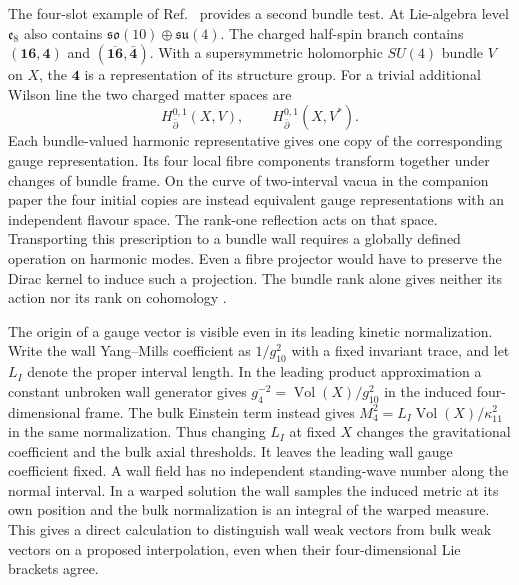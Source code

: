\documentclass[aps,prd,reprint,onecolumn,nofootinbib,amsmath,amssymb]{revtex4-2}
\begin{document}
The four-slot example of Ref.~\cite{gennote} provides a second bundle test. At Lie-algebra level $\mathfrak e_8$ also contains $\mathfrak{so}(10)\oplus\mathfrak{su}(4)$. The charged half-spin branch contains $(\mathbf{16},\mathbf4)$ and $(\overline{\mathbf{16}},\bar{\mathbf4})$. With a supersymmetric holomorphic $SU(4)$ bundle $V$ on $X$, the $\mathbf4$ is a representation of its structure group. For a trivial additional Wilson line the two charged matter spaces are
\begin{equation}
 H^{0,1}_{\bar\partial}(X,V),\qquad
 H^{0,1}_{\bar\partial}(X,V^*) .
\end{equation}
Each bundle-valued harmonic representative gives one copy of the corresponding gauge representation. Its four local fibre components transform together under changes of bundle frame. On the curve of two-interval vacua in the companion paper the four initial copies are instead equivalent gauge representations with an independent flavour space. The rank-one reflection acts on that space. Transporting this prescription to a bundle wall requires a globally defined operation on harmonic modes. Even a fibre projector would have to preserve the Dirac kernel to induce such a projection. The bundle rank alone gives neither its action nor its rank on cohomology \cite{Braun2005,gennote,TwoEndpoint2026}.

The origin of a gauge vector is visible even in its leading kinetic normalization. Write the wall Yang--Mills coefficient as $1/g_{10}^2$ with a fixed invariant trace, and let $L_I$ denote the proper interval length. In the leading product approximation a constant unbroken wall generator gives $g_4^{-2}=\operatorname{Vol}(X)/g_{10}^2$ in the induced four-dimensional frame. The bulk Einstein term instead gives $M_4^2=L_I\operatorname{Vol}(X)/\kappa_{11}^2$ in the same normalization. Thus changing $L_I$ at fixed $X$ changes the gravitational coefficient and the bulk axial thresholds. It leaves the leading wall gauge coefficient fixed. A wall field has no independent standing-wave number along the normal interval. In a warped solution the wall samples the induced metric at its own position and the bulk normalization is an integral of the warped measure. This gives a direct calculation to distinguish wall weak vectors from bulk weak vectors on a proposed interpolation, even when their four-dimensional Lie brackets agree.
\end{document}
